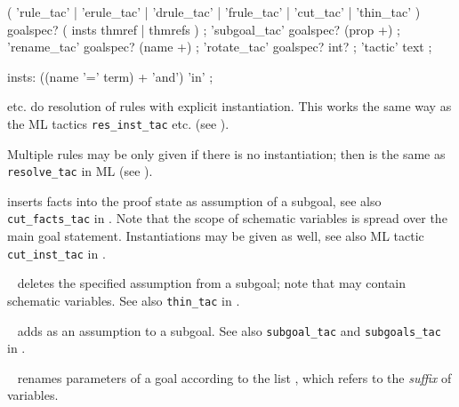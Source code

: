 \begin{isabellebody}
\begin{isamarkuptext}
  \begin{rail}
    ( 'rule\_tac' | 'erule\_tac' | 'drule\_tac' | 'frule\_tac' | 'cut\_tac' | 'thin\_tac' ) goalspec?
    ( insts thmref | thmrefs )
    ;
    'subgoal\_tac' goalspec? (prop +)
    ;
    'rename\_tac' goalspec? (name +)
    ;
    'rotate\_tac' goalspec? int?
    ;
    'tactic' text
    ;

    insts: ((name '=' term) + 'and') 'in'
    ;
  \end{rail}

\begin{descr}

  \item [\hyperlink{method.rule_tac}{\mbox{\isa{rule{\isacharunderscore}tac}}} etc.] do resolution of rules with explicit
  instantiation.  This works the same way as the ML tactics \verb|res_inst_tac| etc. (see \cite[\S3]{isabelle-ref}).

  Multiple rules may be only given if there is no instantiation; then
  \hyperlink{method.rule_tac}{\mbox{}} is the same as \verb|resolve_tac| in ML (see
  \cite[\S3]{isabelle-ref}).

  \item [\hyperlink{method.cut_tac}{\mbox{\isa{cut{\isacharunderscore}tac}}}] inserts facts into the proof state as
  assumption of a subgoal, see also \verb|cut_facts_tac| in
  \cite[\S3]{isabelle-ref}.  Note that the scope of schematic
  variables is spread over the main goal statement.  Instantiations
  may be given as well, see also ML tactic \verb|cut_inst_tac| in
  \cite[\S3]{isabelle-ref}.

  \item [\hyperlink{method.thin_tac}{\mbox{\isa{thin{\isacharunderscore}tac}}}~\isa{{\isasymphi}}] deletes the specified
  assumption from a subgoal; note that \isa{{\isasymphi}} may contain schematic
  variables.  See also \verb|thin_tac| in \cite[\S3]{isabelle-ref}.

  \item [\hyperlink{method.subgoal_tac}{\mbox{\isa{subgoal{\isacharunderscore}tac}}}~\isa{{\isasymphi}}] adds \isa{{\isasymphi}} as an
  assumption to a subgoal.  See also \verb|subgoal_tac| and \verb|subgoals_tac| in \cite[\S3]{isabelle-ref}.

  \item [\hyperlink{method.rename_tac}{\mbox{\isa{rename{\isacharunderscore}tac}}}~\isa{{\isachardoublequote}x\isactrlsub {\isadigit{1}}\ {\isasymdots}\ x\isactrlsub n{\isachardoublequote}}] renames
  parameters of a goal according to the list , which refers to the \emph{suffix} of variables.


\end{descr}
\end{isamarkuptext}
\end{isabellebody}
